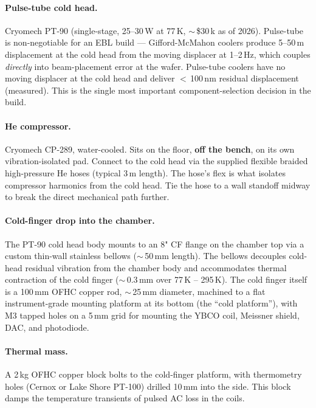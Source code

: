 \documentclass[11pt,letterpaper]{article}
\begin{document}
\paragraph{Pulse-tube cold head.} Cryomech PT-90 (single-stage, 25--30\,W at 77\,K, $\sim$\,\$30\,k as of 2026). Pulse-tube is non-negotiable for an EBL build --- Gifford-McMahon coolers produce 5--50\,\textmu m displacement at the cold head from the moving displacer at 1--2\,Hz, which couples \textit{directly} into beam-placement error at the wafer. Pulse-tube coolers have no moving displacer at the cold head and deliver $<$\,100\,nm residual displacement (measured). This is the single most important component-selection decision in the build.

\paragraph{He compressor.} Cryomech CP-289, water-cooled. Sits on the floor, \textbf{off the bench}, on its own vibration-isolated pad. Connect to the cold head via the supplied flexible braided high-pressure He hoses (typical 3\,m length). The hose's flex is what isolates compressor harmonics from the cold head. Tie the hose to a wall standoff midway to break the direct mechanical path further.

\paragraph{Cold-finger drop into the chamber.} The PT-90 cold head body mounts to an 8" CF flange on the chamber top via a custom thin-wall stainless bellows ($\sim$\,50\,mm length). The bellows decouples cold-head residual vibration from the chamber body and accommodates thermal contraction of the cold finger ($\sim$\,0.3\,mm over 77\,K -- 295\,K). The cold finger itself is a 100\,mm OFHC copper rod, $\sim$\,25\,mm diameter, machined to a flat instrument-grade mounting platform at its bottom (the ``cold platform''), with M3 tapped holes on a 5\,mm grid for mounting the YBCO coil, Meissner shield, DAC, and photodiode.

\paragraph{Thermal mass.} A 2\,kg OFHC copper block bolts to the cold-finger platform, with thermometry holes (Cernox or Lake Shore PT-100) drilled 10\,mm into the side. This block damps the temperature transients of pulsed AC loss in the coils.
\end{document}
